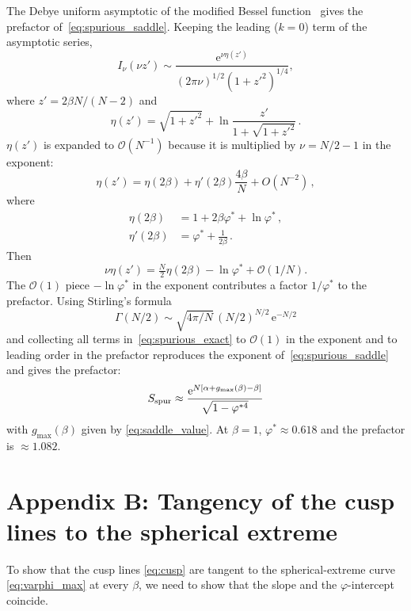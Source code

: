 \documentclass[letterpaper]{article} %
\newcommand{\e}{{\mathrm{e}}}
\newcommand{\Bnet}{\beta}
\begin{document}
The Debye uniform asymptotic of the modified Bessel function~\citep[10.41.3]{olver2010nist}
gives the prefactor of~\eqref{eq:spurious_saddle}. Keeping the leading ($k = 0$) term of
the asymptotic series,
\begin{equation}
I_\nu(\nu z') \sim \frac{\e^{\nu\eta(z')}}{(2\pi\nu)^{1/2}(1+{z'}^2)^{1/4}},
\end{equation}
where $z' = 2\Bnet N/(N-2)$ and
\begin{equation}
    \eta(z') = \sqrt{1+{z'}^2} + \ln\frac{z'}{1+\sqrt{1+{z'}^2}}\,.
    \label{eq:bessel_debye}
\end{equation}  
$\eta(z')$ is expanded to $\mathcal{O}(N^{-1})$ because it is multiplied by
$\nu = N/2 - 1$ in the exponent:
\begin{equation}
    \eta(z') = \eta(2\Bnet) + \eta'(2\Bnet) \frac{4\Bnet}{N} + O(N^{-2})\,,
\end{equation}
where
\begin{align}
    \eta(2\Bnet)  &= 1 + 2\Bnet\varphi^* + \ln\varphi^*\,, \\
    \eta'(2\Bnet) &= \varphi^* + \frac{1}{2\Bnet}\,.
\end{align}
Then 
\begin{equation}
    \nu \eta(z') = \tfrac{N}{2} \eta(2\Bnet) - \ln\varphi^* + \mathcal{O}(1/N).
\end{equation}
The $\mathcal{O}(1)$ piece $-\ln\varphi^*$ in the exponent contributes a factor
$1/\varphi^*$ to the prefactor. Using Stirling's formula
\begin{equation}
    \Gamma(N/2) \sim \sqrt{4\pi/N}\,(N/2)^{N/2}\,\e^{-N/2}
\end{equation} 
and collecting all terms in~\eqref{eq:spurious_exact} to $\mathcal{O}(1)$ in the
exponent and to leading order in the prefactor reproduces the exponent
of~\eqref{eq:spurious_saddle} and gives the prefactor:
\begin{equation}
S_{\rm spur} \approx \frac{\e^{N[\alpha + g_{\max}(\Bnet) - \Bnet]}}{\sqrt{1-\varphi^{*4}}}
\label{eq:spurious_laplace}
\end{equation}
with $g_{\max}(\Bnet)$ given by \eqref{eq:saddle_value}.
At $\Bnet = 1$, $\varphi^* \approx 0.618$ and the prefactor is $\approx 1.082$.


\section{Appendix B: Tangency of the cusp lines to the spherical extreme}

To show that the cusp lines \eqref{eq:cusp} are tangent to the
spherical-extreme curve \eqref{eq:varphi_max} at every
$\Bnet$, we need to show that the slope and the $\varphi$-intercept
coincide.
\end{document}
